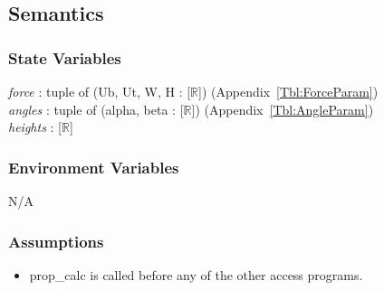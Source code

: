 \documentclass[12pt, titlepage]{article}
\begin{document}
\subsection{Semantics}

\subsubsection{State Variables}

\textit{force} : tuple of (Ub, Ut, W, H : [$\mathbb{R}$]) 
(Appendix~\ref{Tbl:ForceParam})\\
\textit{angles} : tuple of (alpha, beta : [$\mathbb{R}$]) 
(Appendix~\ref{Tbl:AngleParam})\\
\textit{heights} : [$\mathbb{R}$]\\

\subsubsection{Environment Variables}
N/A

\subsubsection{Assumptions}
\begin{itemize}
	\item prop\_calc is called before any of the other access programs.
\end{itemize}
\end{document}

